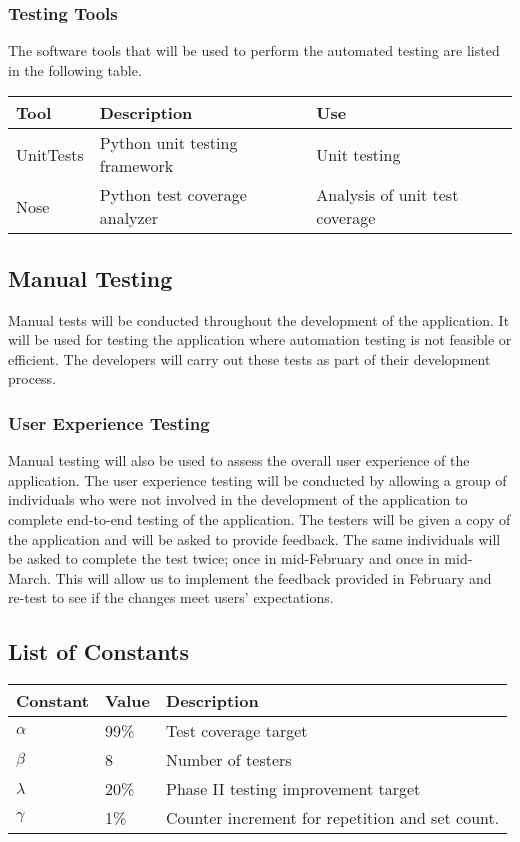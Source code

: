 \documentclass{article}
\begin{document}
\subsubsection{Testing Tools}
The software tools that will be used to perform the automated testing are listed in the following table.

\begingroup
\begin{tabular}{ | p{3cm} | p{5cm} | p{5cm} |} 
    \hline
    \textbf{Tool} & \textbf{Description} & \textbf{Use}\\
    \hline
    UnitTests & Python unit testing framework& Unit testing \\
    \hline
    Nose & Python test coverage analyzer & Analysis of unit test coverage\\
    \hline
\end{tabular}
\endgroup

\subsection{Manual Testing} 
Manual tests will be conducted throughout the development of the application. It will be used for testing the application where automation testing is not feasible or efficient. The developers will carry out these tests as part of their development process. 

\subsubsection{User Experience Testing} 
Manual testing will also be used to assess the overall user experience of the application. The user experience testing will be conducted by allowing a group of individuals who were not involved in the development of the application to complete end-to-end testing of the application. The testers will be given a copy of the application and will be asked to provide feedback. The same individuals will be asked to complete the test twice; once in mid-February and once in mid-March. This will allow us to implement the feedback provided in February and re-test to see if the changes meet users' expectations. 

\subsection{List of Constants} 
\begingroup
\begin{center}
\begin{tabular}{ | p{2cm} | p{2cm} | p{6cm} |} 
    \hline
    \textbf{Constant} & \textbf{Value} & \textbf{Description}\\
    \hline
    $\alpha$ & 99\% & Test coverage target \\
    \hline
    $\beta$ & 8 & Number of testers\\
    \hline
    $\lambda$ & 20\% & Phase II testing improvement target\\
    \hline
     $\gamma$ & 1\% & Counter increment for repetition and set count.\\
    \hline
\end{tabular}
\end{center}
\endgroup
\end{document}
